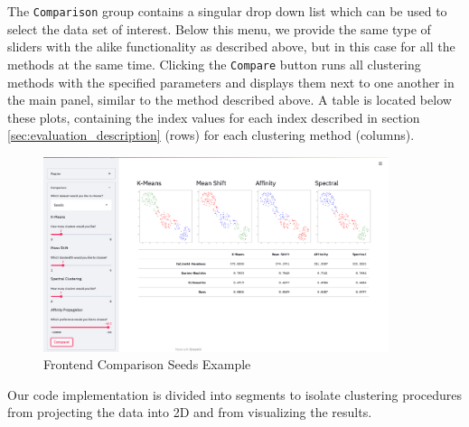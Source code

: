 The \texttt{Comparison} group contains a singular drop down list which can be used to select the data set of interest. Below this menu, we provide the same type of sliders with the alike functionality as described above, but in this case for all the methods at the same time. Clicking the \texttt{Compare} button runs all clustering methods with the specified parameters and displays them next to one another in the main panel, similar to the method described above. A table is located below these plots, containing the index values for each index described in section \ref{sec:evaluation_description} (rows) for each clustering method (columns).

\begin{figure}[H]
%
\begin{center}
\includegraphics[width=0.9\textwidth]{images/frontend_comparison.png}
\caption{Frontend Comparison Seeds Example}
\end{center}
\label{img:frontend_screenshot_comparison}
\end{figure}

Our code implementation is divided into segments to isolate clustering procedures from projecting the data into 2D and from visualizing the results.

